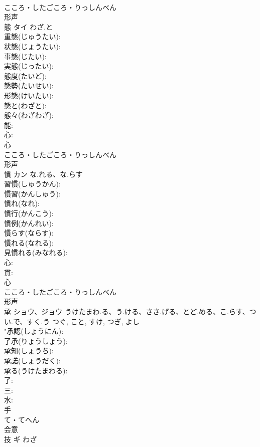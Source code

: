 \documentclass[8pt]{extreport}
\begin{document}
\begin{CJK}{UTF8}{min}
\\	こころ・したごころ・りっしんべん	
\\	形声 
\\	態	タイ	わざ.と		
\\	重態(じゅうたい): 
\\	状態(じょうたい): 
\\	事態(じたい): 
\\	実態(じったい): 
\\	態度(たいど): 
\\	態勢(たいせい): 
\\	形態(けいたい): 
\\	態と(わざと): 
\\	態々(わざわざ): 
\\	能: 
\\	心: 
\\	心	
\\	こころ・したごころ・りっしんべん	
\\	形声 
\\	慣	カン	な.れる、な.らす		
\\	習慣(しゅうかん): 
\\	慣習(かんしゅう): 
\\	慣れ(なれ): 
\\	慣行(かんこう): 
\\	慣例(かんれい): 
\\	慣らす(ならす): 
\\	慣れる(なれる): 
\\	見慣れる(みなれる): 
\\	心: 
\\	貫: 
\\	心	
\\	こころ・したごころ・りっしんべん	
\\	形声 
\\	承	ショウ、ジョウ	うけたまわ.る、う.ける、ささ.げる、とど.める、こ.らす、つい.で、すく.う	つぐ, こと, すけ, つぎ, よし	
\\	"承認(しょうにん): 
\\	了承(りょうしょう): 
\\	承知(しょうち): 
\\	承諾(しょうだく): 
\\	承る(うけたまわる): 
\\	了: 
\\	三: 
\\	水: 
\\	手	
\\	て・てへん	
\\	会意 
\\	技	ギ	わざ		

\end{CJK}
\end{document}
